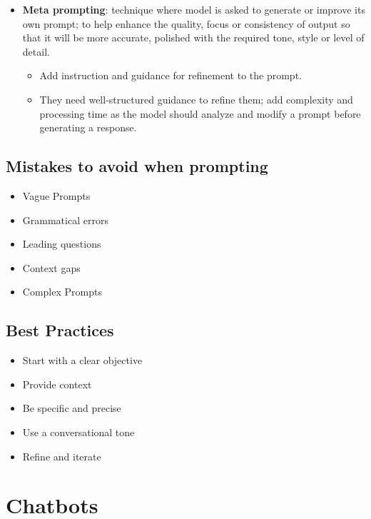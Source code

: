 \documentclass[12pt, letterpaper]{article}
\begin{document}
\begin{itemize}
\begin{itemize}
            \item They are less effective for tasks with complex or branching logic as the model follows a liner reasoning chain; best with instructions are clear and guide effectively, as vague instructions = poor output.
        \end{itemize}
    \item \textbf{Meta prompting}: technique where model is asked to generate or improve its own prompt; to help enhance the quality, focus or consistency of output so that it will be more accurate, polished with the required tone, style or level of detail.
        \begin{itemize}
            \item Add instruction and guidance for refinement to the prompt.
            \item They need well-structured guidance to refine them; add complexity and processing time as the model should analyze and modify a prompt before generating a response.
        \end{itemize}
\end{itemize}

\subsection{Mistakes to avoid when prompting}
\begin{itemize}
    \item Vague Prompts
    \item Grammatical errors
    \item Leading questions
    \item Context gaps
    \item Complex Prompts
\end{itemize}

\subsection{Best Practices}
\begin{itemize}
    \item Start with a clear objective
    \item Provide context
    \item Be specific and precise
    \item Use a conversational tone
    \item Refine and iterate
\end{itemize}

\section{Chatbots}
\end{document}

